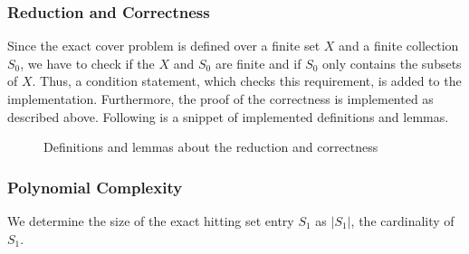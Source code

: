 \subsubsection*{Reduction and Correctness}
Since the exact cover problem is defined over a finite set $X$ and a finite collection $S_0$, we have to check if the $X$ and $S_0$ are finite and 
if $S_0$ only contains the subsets of $X$. Thus, a condition statement, which checks this requirement, is added to the implementation. Furthermore,
the proof of the correctness is implemented as described above. Following is a snippet of implemented definitions and lemmas.
\begin{figure}
    \caption{Definitions and lemmas about the reduction and correctness}
\end{figure}

\subsubsection*{Polynomial Complexity}
We determine the size of the exact hitting set entry $S_1$ as $|S_1|$, the cardinality of $S_1$. 



